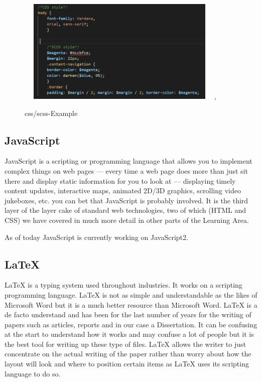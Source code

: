 \documentclass[12pt,a4paper,oneside,openany]{book}
\begin{document}
\begin{figure}[ht]
\renewcommand\thefigure{4.7}
\centering
\includegraphics[width=10cm, height=5cm]{Images/scss.png},
\caption{css/scss-Example}
\label{scss}
\end{figure}

\subsection{JavaScript}
JavaScript is a scripting or programming language that allows you to implement complex things on web pages — every time a web page does more than just sit there and display static information for you to look at — displaying timely content updates, interactive maps, animated 2D/3D graphics, scrolling video jukeboxes, etc. you can bet that JavaScript is probably involved. It is the third layer of the layer cake of standard web technologies, two of which (HTML and CSS) we have covered in much more detail in other parts of the Learning Area. \cite{js}

As of today JavaScript is currently working on JavaScript2.

\subsection{LaTeX}
LaTeX is a typing system used throughout industries. It works on a scripting programming language. LaTeX is not as simple and understandable as the likes of Microsoft Word but it is a much better resource than Microsoft Word. LaTeX is a de facto understand and has been for the last number of years for the writing of papers such as articles, reports and in our case a Dissertation. It can be confusing at the start to understand how it works and may confuse a lot of people but it is the best tool for writing up these type of files. LaTeX allows the writer to just concentrate on the actual writing of the paper rather than worry about how the layout will look and where to position certain items as LaTeX uses its scripting language to do so. \cite{latex}
\end{document}
